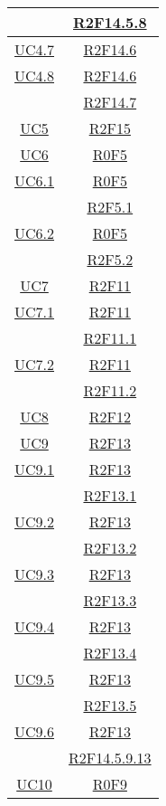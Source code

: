 \begin{longtable}{|c|c|}
& \hyperlink{R2F14.5.8}{R2F14.5.8}\\
\hline
\hyperlink{UC4.7}{UC4.7} & \hyperlink{R2F14.6}{R2F14.6}\\
\hline
\hyperlink{UC4.8}{UC4.8} & \hyperlink{R2F14.6}{R2F14.6}\\
& \hyperlink{R2F14.7}{R2F14.7}\\
\hline
\hyperlink{UC5}{UC5} & \hyperlink{R2F15}{R2F15}\\
\hline
\hyperlink{UC6}{UC6} & \hyperlink{R0F5}{R0F5}\\
\hline
\hyperlink{UC6.1}{UC6.1} & \hyperlink{R0F5}{R0F5}\\
& \hyperlink{R2F5.1}{R2F5.1}\\
\hline
\hyperlink{UC6.2}{UC6.2} & \hyperlink{R0F5}{R0F5}\\
& \hyperlink{R2F5.2}{R2F5.2}\\
\hline
\hyperlink{UC7}{UC7} & \hyperlink{R2F11}{R2F11}\\
\hline
\hyperlink{UC7.1}{UC7.1} & \hyperlink{R2F11}{R2F11}\\
& \hyperlink{R2F11.1}{R2F11.1}\\
\hline
\hyperlink{UC7.2}{UC7.2} & \hyperlink{R2F11}{R2F11}\\
& \hyperlink{R2F11.2}{R2F11.2}\\
\hline
\hyperlink{UC8}{UC8} & \hyperlink{R2F12}{R2F12}\\
\hline
\hyperlink{UC9}{UC9} & \hyperlink{R2F13}{R2F13}\\
\hline
\hyperlink{UC9.1}{UC9.1} & \hyperlink{R2F13}{R2F13}\\
& \hyperlink{R2F13.1}{R2F13.1}\\
\hline
\hyperlink{UC9.2}{UC9.2} & \hyperlink{R2F13}{R2F13}\\
& \hyperlink{R2F13.2}{R2F13.2}\\
\hline
\hyperlink{UC9.3}{UC9.3} & \hyperlink{R2F13}{R2F13}\\
& \hyperlink{R2F13.3}{R2F13.3}\\
\hline
\hyperlink{UC9.4}{UC9.4} & \hyperlink{R2F13}{R2F13}\\
& \hyperlink{R2F13.4}{R2F13.4}\\
\hline
\hyperlink{UC9.5}{UC9.5} & \hyperlink{R2F13}{R2F13}\\
& \hyperlink{R2F13.5}{R2F13.5}\\
\hline
\hyperlink{UC9.6}{UC9.6} & \hyperlink{R2F13}{R2F13}\\
& \hyperlink{R2F14.5.9.13}{R2F14.5.9.13}\\
\hline
\hyperlink{UC10}{UC10} & \hyperlink{R0F9}{R0F9}\\

\end{longtable}
